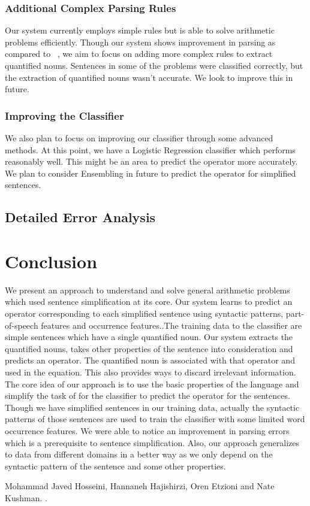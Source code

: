 \documentclass[11pt]{article}
\begin{document}
\subsubsection{Additional Complex Parsing Rules}
Our system currently employs simple rules but is able to solve arithmetic problems efficiently. Though our system shows improvement in parsing as compared to ~\cite{Hosseini:14}, we aim to focus on adding more complex rules to extract quantified nouns. Sentences in some of the problems were classified correctly, but the extraction of quantified nouns wasn't accurate. We look to improve this in future.

\subsubsection{Improving the Classifier}
We also plan to focus on improving our classifier through some advanced methods. At this point, we have a Logistic Regression classifier which performs reasonably well. This might be an area to predict the operator more accurately. We plan to consider Ensembling in future to predict the operator for simplified sentences.

\subsection{Detailed Error Analysis}

\section{Conclusion}
We present an approach to understand and solve general arithmetic problems which used sentence simplification at its core. Our system learns to predict an operator corresponding to each simplified sentence using syntactic patterns, part-of-speech features and occurrence features..The training data to the classifier are simple sentences which have a single quantified noun. Our system extracts the quantified nouns, takes other properties of the sentence into consideration and predicts an operator. The quantified noun is associated with that operator and used in the equation. This also provides ways to discard irrelevant information. The core idea of our approach is to use the basic properties of the language and simplify the task of for the classifier to predict the operator for the sentences.\newline
Though we have simplified sentences in our training data, actually the syntactic patterns of those sentences are used to train the classifier with some limited word occurrence features. We were able to notice an improvement in parsing errors which is a prerequisite to sentence simplification.  Also, our approach generalizes to data from different domains in a better way as we only depend on the syntactic pattern of the sentence and some other properties.\newline

\begin{thebibliography}{}
  
  Mohammad Javed Hosseini, Hannaneh Hajishirzi, Oren Etzioni and Nate Kushman.
  .
  
\end{thebibliography}
\end{document}
